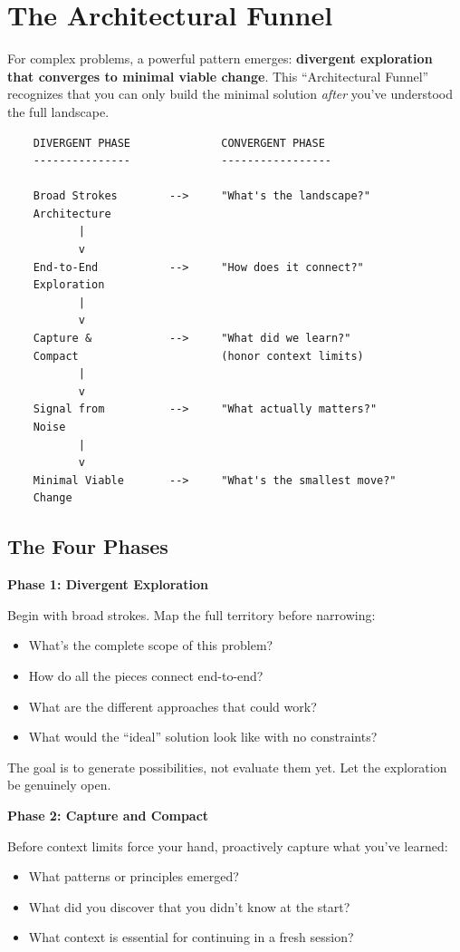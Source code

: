 \section{The Architectural Funnel}\label{sec:architectural-funnel}

For complex problems, a powerful pattern emerges: \textbf{divergent exploration that converges to minimal viable change}. This ``Architectural Funnel'' recognizes that you can only build the minimal solution \emph{after} you've understood the full landscape.

\begin{lstlisting}
    DIVERGENT PHASE              CONVERGENT PHASE
    ---------------              -----------------

    Broad Strokes        -->     "What's the landscape?"
    Architecture
           |
           v
    End-to-End           -->     "How does it connect?"
    Exploration
           |
           v
    Capture &            -->     "What did we learn?"
    Compact                      (honor context limits)
           |
           v
    Signal from          -->     "What actually matters?"
    Noise
           |
           v
    Minimal Viable       -->     "What's the smallest move?"
    Change
\end{lstlisting}

\subsection{The Four Phases}

\textbf{Phase 1: Divergent Exploration}

Begin with broad strokes. Map the full territory before narrowing:
\begin{itemize}
    \item What's the complete scope of this problem?
    \item How do all the pieces connect end-to-end?
    \item What are the different approaches that could work?
    \item What would the ``ideal'' solution look like with no constraints?
\end{itemize}

The goal is to generate possibilities, not evaluate them yet. Let the exploration be genuinely open.

\textbf{Phase 2: Capture and Compact}

Before context limits force your hand, proactively capture what you've learned:
\begin{itemize}
    \item What patterns or principles emerged?
    \item What did you discover that you didn't know at the start?
    \item What context is essential for continuing in a fresh session?
\end{itemize}

